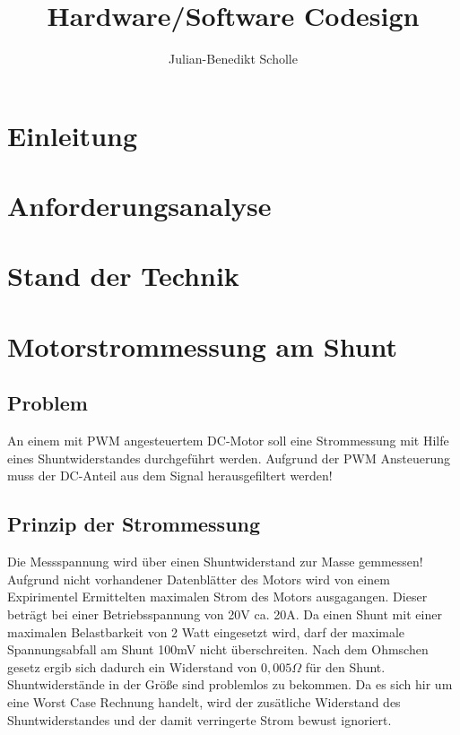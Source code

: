 \documentclass[11pt,twoside,a4paper,openright]{mpreport}
\title{Hardware/Software Codesign}
\author{Julian-Benedikt Scholle}
\begin{document}
\maketitle
\tableofcontents

\chapter{Einleitung}

\chapter{Anforderungsanalyse}

\chapter{Stand der Technik}

\chapter{Motorstrommessung am Shunt}


\section{Problem}

An einem mit PWM angesteuertem DC-Motor soll eine Strommessung mit Hilfe eines Shuntwiderstandes
durchgeführt werden. Aufgrund der PWM Ansteuerung muss der DC-Anteil aus dem Signal herausgefiltert werden!


\section{Prinzip der Strommessung}

Die Messspannung wird über einen Shuntwiderstand zur Masse gemmessen! Aufgrund nicht vorhandener Datenblätter des Motors
wird von einem Expirimentel Ermittelten maximalen Strom des Motors ausgagangen. Dieser beträgt bei einer Betriebsspannung von 20V ca. 20A.
Da einen Shunt mit einer maximalen Belastbarkeit von 2 Watt eingesetzt wird, darf der maximale Spannungsabfall am Shunt 100mV nicht überschreiten.
Nach dem Ohmschen gesetz ergib sich dadurch ein Widerstand von $0,005 \Omega$  für den Shunt. Shuntwiderstände in der Größe sind problemlos zu bekommen.
Da es sich hir um eine Worst Case Rechnung handelt, wird der zusätliche Widerstand des Shuntwiderstandes und der damit verringerte Strom bewust ignoriert.
\end{document}
